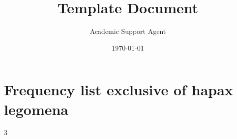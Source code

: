 \documentclass{article}
\title{Template Document}
\author{Academic Support Agent}
\date{\today}
\begin{document}
\maketitle







%



\renewcommand{\chaptermark}[1]{\markboth{\small \thechapter. #1}{}}




\renewcommand{\chaptermark}[1]{\markboth{\small Appendix \thechapter. #1}{}}

\chapter{Frequency list exclusive of hapax legomena} \label{app:freq}
\begin{multicols}{3}
{\footnotesize}
\end{multicols}


 {}


%
\end{document}
